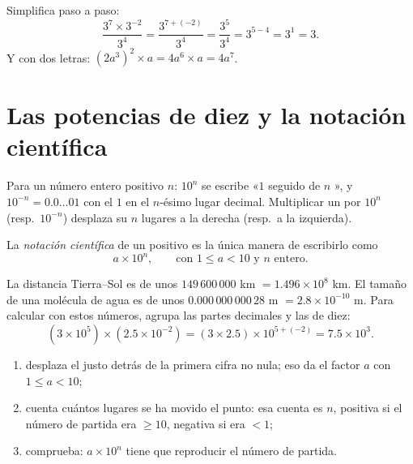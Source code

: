 \begin{example}\label{ex:g9:fractions:rules}
Simplifica paso a paso:
\[
\frac{3^7 \times 3^{-2}}{3^4}
= \frac{3^{7 + (-2)}}{3^4}
= \frac{3^5}{3^4}
= 3^{5-4} = 3^1 = 3 .
\]
Y con dos letras: $(2a^3)^2 \times a = 4 a^6 \times a = 4a^7$.
\end{example}

\section{Las potencias de diez y la notación científica}

\begin{proposition}\label{prop:g9:fractions:ten}
Para un número entero positivo $n$: $10^n$ se escribe «$1$ seguido de $n$
», y $10^{-n} = 0.0\dots01$ con el $1$ en el $n$-ésimo lugar
decimal. Multiplicar un  por $10^n$ (resp.\ $10^{-n}$) desplaza
su  $n$ lugares a la derecha (resp.\ a la izquierda).
\end{proposition}

\begin{definition}\label{def:g9:fractions:scientific}
La \emph{notación científica} de un
 positivo es la única manera de escribirlo como
\[
a \times 10^n,
\qquad\text{con } 1 \leq a < 10 \text{ y } n \text{ entero.}
\]
\end{definition}

\begin{example}\label{ex:g9:fractions:scientific}
La distancia Tierra--Sol es de unos $149\,600\,000$ km $= 1.496 \times
10^8$ km. El tamaño de una molécula de agua es de unos $0.000\,000\,000\,28$ m
$= 2.8 \times 10^{-10}$ m. Para calcular con estos números, agrupa las
partes decimales y las  de diez:
\[
(3 \times 10^5) \times (2.5 \times 10^{-2})
= (3 \times 2.5) \times 10^{5 + (-2)}
= 7.5 \times 10^{3}.
\]
\end{example}

\begin{method}\label{met:g9:fractions:scientific}
\begin{enumerate}
  \item desplaza el  justo detrás de la primera cifra no nula; eso
        da el factor $a$ con $1 \leq a < 10$;
  \item cuenta cuántos lugares se ha movido el punto: esa cuenta es $n$,
        positiva si el número de partida era $\geq 10$, negativa si era
        $< 1$;
  \item comprueba: $a \times 10^n$ tiene que reproducir el número de partida.
\end{enumerate}
\end{method}

